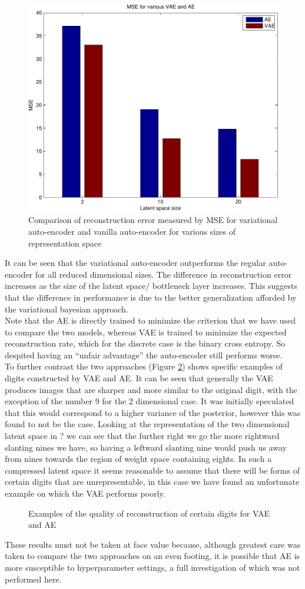 \documentclass[../report/report.tex]{subfiles}
\begin{document}
\begin{figure}[hbt]
\centering
\hspace{0em}
\includegraphics[width=0.4\columnwidth]{../../res/mnist_mse.pdf}
\caption{Comparison of reconstruction error measured by MSE for variational auto-encoder and vanilla auto-encoder for various sizes of representation space}
\label{fig:AE_MSE}
\end{figure}

It can be seen that the variational auto-encoder outperforms the regular auto-encoder for all reduced dimensional sizes. The difference in reconstruction error increases as the size of the latent space/ bottleneck layer increases. This suggests that the difference in performance is due to the better generalization afforded by the variational bayesian approach.\\ Note that the AE is directly trained to minimize the criterion that we have used to compare the two models, whereas VAE is trained to minimize the expected reconstruction rate, which for the discrete case is the binary cross entropy. So despited having an ``unfair advantage'' the auto-encoder still performs worse.\\
To further contrast the two approaches (Figure \ref{fig:AE_recon}) shows specific examples of digits constructed by VAE and AE. It can be seen that generally the VAE produces images that are sharper and more similar to the original digit, with the exception of the number 9 for the 2 dimensional case. It was initially speculated that this would correspond to a higher variance of the posterior, however this was found to not be the case. Looking at the representation of the two dimensional latent space in $?$ we can see that the further right we go the more rightward slanting nines we have, so having a leftward slanting nine would push us away from nines towards the region of weight space containing eights. In such a compressed latent space it seems reasonable to assume that there will be forms of certain digits that are unrepresentable, in this case we have found an unfortunate example on which the VAE performs poorly.\\

\begin{figure}[hbt]
\centering
\hspace{0em}
\caption{Examples of the quality of reconstruction of certain digits for VAE and AE}
\label{fig:AE_recon}
\end{figure}

These results must not be taken at face value because, although greatest care was taken to compare the two approaches on an even footing, it is possible that AE is more susceptible to hyperparameter settings, a full investigation of which was not performed here.\\
\end{document}
